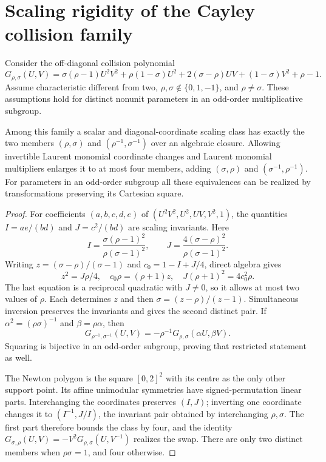 \section{Scaling rigidity of the Cayley collision family}
\label{sec:cayley-scaling}
Consider the off-diagonal collision polynomial
\[
 G_{\rho,\sigma}(U,V)=\sigma(\rho-1)U^2V^2+\rho(1-\sigma)U^2
          +2(\sigma-\rho)UV+(1-\sigma)V^2+\rho-1.
\]
Assume characteristic different from two, $\rho,\sigma\notin\{0,1,-1\}$,
and $\rho\ne\sigma$. These assumptions hold for distinct nonunit parameters
in an odd-order multiplicative subgroup.

\begin{proposition}
Among this family a scalar and diagonal-coordinate scaling class has exactly
the two members $(\rho,\sigma)$ and $(\rho^{-1},\sigma^{-1})$ over an
algebraic closure. Allowing invertible Laurent monomial coordinate changes
and Laurent monomial multipliers enlarges it to at most four members, adding
$(\sigma,\rho)$ and $(\sigma^{-1},\rho^{-1})$.
For parameters in an odd-order subgroup all these equivalences can be
realized by transformations preserving its Cartesian square.
\end{proposition}
\begin{proof}
For coefficients $(a,b,c,d,e)$ of $(U^2V^2,U^2,UV,V^2,1)$, the quantities
$I=ae/(bd)$ and $J=c^2/(bd)$ are scaling invariants. Here
\[
 I=\frac{\sigma(\rho-1)^2}{\rho(\sigma-1)^2},\qquad
 J=\frac{4(\sigma-\rho)^2}{\rho(\sigma-1)^2}.
\]
Writing $z=(\sigma-\rho)/(\sigma-1)$ and $c_0=1-I+J/4$, direct algebra gives
\[
 z^2=J\rho/4,\quad c_0\rho=(\rho+1)z,\quad
                       J(\rho+1)^2=4c_0^2\rho.
\]
The last equation is a reciprocal quadratic with $J\ne0$, so it allows at
most two values of $\rho$. Each determines $z$ and then
$\sigma=(z-\rho)/(z-1)$. Simultaneous inversion preserves the invariants
and gives the second distinct pair. If
$\alpha^2=(\rho\sigma)^{-1}$ and $\beta=\rho\alpha$, then
\[
 G_{\rho^{-1},\sigma^{-1}}(U,V)
     =-\rho^{-1}G_{\rho,\sigma}(\alpha U,\beta V).
\]
Squaring is bijective in an odd-order subgroup, proving that restricted
statement as well.

The Newton polygon is the square $[0,2]^2$ with its centre as the only other
support point. Its affine unimodular symmetries have signed-permutation
linear parts. Interchanging the coordinates preserves $(I,J)$; inverting one
coordinate changes it to $(I^{-1},J/I)$, the invariant pair obtained by
interchanging $\rho,\sigma$. The first part therefore bounds the class by
four, and the identity
$G_{\sigma,\rho}(U,V)=-V^2G_{\rho,\sigma}(U,V^{-1})$ realizes the swap.
There are only two distinct members when $\rho\sigma=1$, and four otherwise.
\end{proof}

